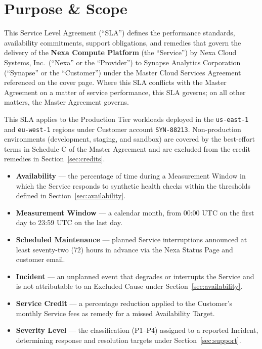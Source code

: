 
\section{Purpose \& Scope}
\label{sec:scope}

This Service Level Agreement (``SLA'') defines the performance standards, availability
commitments, support obligations, and remedies that govern the delivery of the
\textbf{Nexa Compute Platform} (the ``Service'') by Nexa Cloud Systems, Inc.\ (``Nexa'' or
the ``Provider'') to Synapse Analytics Corporation (``Synapse'' or the ``Customer'') under
the Master Cloud Services Agreement referenced on the cover page. Where this SLA conflicts
with the Master Agreement on a matter of service performance, this SLA governs; on all
other matters, the Master Agreement governs.

This SLA applies to the Production Tier workloads deployed in the \texttt{us-east-1} and
\texttt{eu-west-1} regions under Customer account \texttt{SYN-88213}. Non-production
environments (development, staging, and sandbox) are covered by the best-effort terms in
Schedule C of the Master Agreement and are excluded from the credit remedies in
Section~\ref{sec:credits}.

\begin{definebox}
\begin{itemize}
  \item \textbf{Availability} --- the percentage of time during a Measurement Window in
    which the Service responds to synthetic health checks within the thresholds defined
    in Section~\ref{sec:availability}.
  \item \textbf{Measurement Window} --- a calendar month, from 00:00 UTC on the first day
    to 23:59 UTC on the last day.
  \item \textbf{Scheduled Maintenance} --- planned Service interruptions announced at
    least seventy-two (72) hours in advance via the Nexa Status Page and customer email.
  \item \textbf{Incident} --- an unplanned event that degrades or interrupts the Service
    and is not attributable to an Excluded Cause under Section~\ref{sec:availability}.
  \item \textbf{Service Credit} --- a percentage reduction applied to the Customer's
    monthly Service fees as remedy for a missed Availability Target.
  \item \textbf{Severity Level} --- the classification (P1--P4) assigned to a reported
    Incident, determining response and resolution targets under Section~\ref{sec:support}.
\end{itemize}
\end{definebox}

